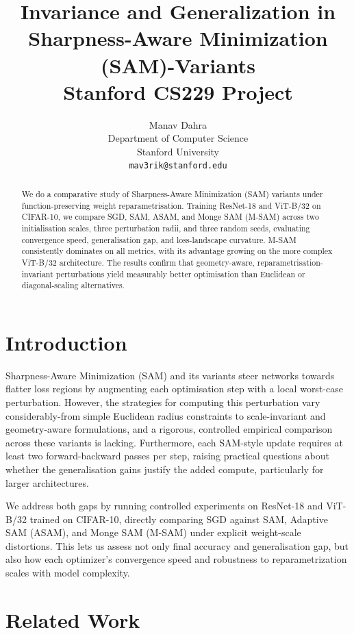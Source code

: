 \documentclass{article}
\title{
  Invariance and Generalization in Sharpness-Aware Minimization (SAM)-Variants \\
  \vspace{1em}
  \small{\normalfont Stanford CS229 Project}  %
}
\author{
  Manav Dahra \\
  Department of Computer Science \\
  Stanford University \\
  \texttt{mav3rik@stanford.edu} \\
}
\begin{document}
\maketitle

\begin{abstract}
We do a comparative study of Sharpness-Aware Minimization (SAM) variants under function-preserving weight reparametrisation. Training ResNet-18 and ViT-B/32 on CIFAR-10, we compare SGD, SAM, ASAM, and Monge SAM (M-SAM) across two initialisation scales, three perturbation radii, and three random seeds, evaluating convergence speed, generalisation gap, and loss-landscape curvature. M-SAM consistently dominates on all metrics, with its advantage growing on the more complex ViT-B/32 architecture. The results confirm that geometry-aware, reparametrisation-invariant perturbations yield measurably better optimisation than Euclidean or diagonal-scaling alternatives.
\end{abstract}



\section{Introduction}

Sharpness-Aware Minimization (SAM) and its variants steer networks towards flatter loss regions by augmenting each optimisation step with a local worst-case perturbation. However, the strategies for computing this perturbation vary considerably-from simple Euclidean radius constraints to scale-invariant and geometry-aware formulations, and a rigorous, controlled empirical comparison across these variants is lacking. Furthermore, each SAM-style update requires at least two forward-backward passes per step, raising practical questions about whether the generalisation gains justify the added compute, particularly for larger architectures.

We address both gaps by running controlled experiments on ResNet-18 and ViT-B/32 trained on CIFAR-10, directly comparing SGD against SAM, Adaptive SAM (ASAM), and Monge SAM (M-SAM) under explicit weight-scale distortions. This lets us assess not only final accuracy and generalisation gap, but also how each optimizer's convergence speed and robustness to reparametrization scales with model complexity.

\section{Related Work}
\end{document}

